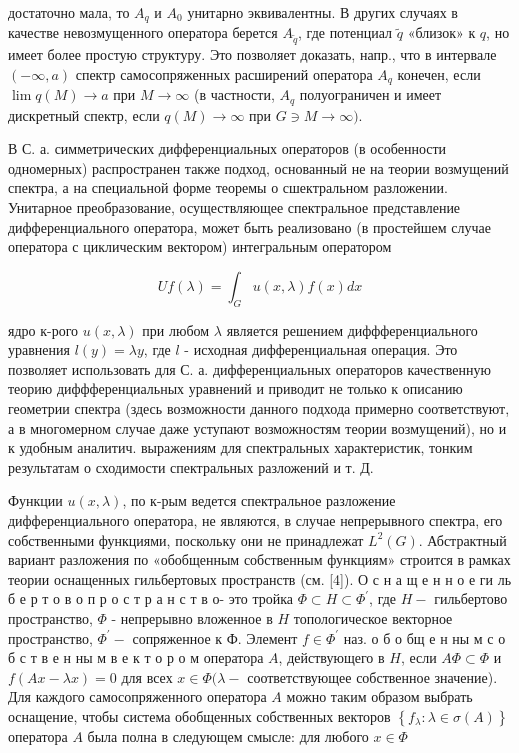 \documentclass[10pt]{article}
\begin{document}
достаточно мала, то $A_{q}$ и $A_{0}$ унитарно эквивалентны. В других случаях в качестве невозмущенного оператора берется $A_{\tilde{q}}$, где потенциал $\tilde{q}$ «близок» к $q$, но имеет более простую структуру. Это позволяет доказать, напр., что в интервале $(-\infty, a)$ спектр самосопряженных расширений оператора $A_{q}$ конечен, если $\lim q(M) \rightarrow a$ при $M \rightarrow \infty$ (в частности, $A_{q}$ полуограничен и имеет дискретный спектр, если $q(M) \rightarrow \infty$ при $G \ni M \rightarrow \infty)$.



В С. а. симметрических дифференциальных операторов (в особенности одномерных) распространен также подход, основанный не на теории возмущений спектра, а на специальной форме теоремы о сшектральном разложении. Унитарное преобразование, осуществляющее спектральное представление дифференциального оператора, может быть реализовано (в простейшем случае оператора с циклическим вектором) интегральным оператором



\[

U f(\lambda)=\int_{G} u(x, \lambda) f(x) d x

\]



ядро к-рого $u(x, \lambda)$ при любом $\lambda$ является решением диффференциального уравнения $l(y)=\lambda y$, где $l$ - исходная дифференциальная операция. Это позволяет использовать для С. а. дифференциальных операторов качественную теорию диффференциальных уравнений и приводит не только к описанию геометрии спектра (здесь возможности данного подхода примерно соответствуют, а в многомерном случае даже уступают возможностям теории возмущений), но и к удобным аналитич. выражениям для спектральных характеристик, тонким результатам о сходимости спектральных разложений и т. Д.



Функции $u(x, \lambda)$, по к-рым ведется спектральное разложение дифференциального оператора, не являются, в случае непрерывного спектра, его собственными функциями, поскольку они не принадлежат $L^{2}(G)$. Абстрактный вариант разложения по «обобщенным собственным функциям» строится в рамках теории оснащенных гильбертовых пространств (см. [4]). О с н а щ е н н о е ги ль б е р т о в о п р о с т р а н с т в о- это тройка $\Phi \subset H \subset \Phi^{\prime}$, где $H-$ гильбертово пространство, $\Phi$ - непрерывно вложенное в $H$ топологическое векторное пространство, $\Phi^{\prime}-$ сопряженное к Ф. Элемент $f \in \Phi^{\prime}$ наз. о б о бщ е н ны м с о б с т в е н ны м в е к т о р о м оператора $A$, действующего в $H$, если $A \Phi \subset \Phi$ и $f(A x-\lambda x)=0$ для всех $x \in \Phi(\lambda-$ соответствующее собственное значение). Для каждого самосопряженного оператора $A$ можно таким образом выбрать оснащение, чтобы система обобщенных собственных векторов $\left\{f_{\lambda}: \lambda \in \sigma(A)\right\}$ оператора $A$ была полна в следующем смысле: для любого $x \in \Phi$
\end{document}
